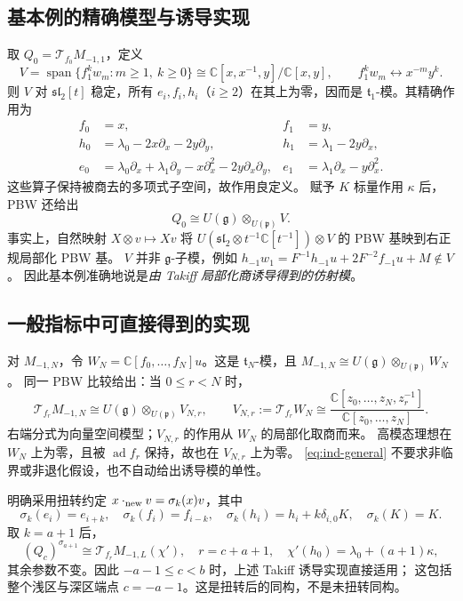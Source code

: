 \documentclass[UTF8,11pt,a4paper,fontset=fandol]{ctexart}
\theoremstyle{upright}
\newcommand{\C}{\mathbb C}
\newcommand{\g}{\mathfrak g}
\newcommand{\p}{\mathfrak p}
\newcommand{\slc}{\mathfrak{sl}_2}
\newcommand{\T}{\mathcal T}
\DeclareMathOperator{\ad}{ad}
\DeclareMathOperator{\Span}{span}
\begin{document}
\subsection{基本例的精确模型与诱导实现}
取 $Q_0=\T_{f_0}M_{-1,1}$，定义
\[
V=\Span\{f_1^kw_m:m\ge1,\ k\ge0\}
\cong\C[x,x^{-1},y]/\C[x,y],\qquad f_1^kw_m\longleftrightarrow x^{-m}y^k.
\]
则 $V$ 对 $\slc[t]$ 稳定，所有 $e_i,f_i,h_i$（$i\ge2$）在其上为零，因而是
$\mathfrak t_1$-模。其精确作用为 \cite[Section 6]{Unified}
\begin{equation}\label{eq:takiff}
\begin{aligned}
f_0&=x,& f_1&=y,\\
h_0&=\lambda_0-2x\partial_x-2y\partial_y,
&h_1&=\lambda_1-2y\partial_x,\\
e_0&=\lambda_0\partial_x+\lambda_1\partial_y
-x\partial_x^2-2y\partial_x\partial_y,
&e_1&=\lambda_1\partial_x-y\partial_x^2.
\end{aligned}
\end{equation}
这些算子保持被商去的多项式子空间，故作用良定义。
赋予 $K$ 标量作用 $\kappa$ 后，PBW 还给出
\begin{equation}\label{eq:ind-basic}
\boxed{\quad Q_0\cong U(\g)\otimes_{U(\p)}V.\quad}
\end{equation}
事实上，自然映射 $X\otimes v\mapsto Xv$ 将
$U(\slc\otimes t^{-1}\C[t^{-1}])\otimes V$ 的 PBW 基映到右正规局部化 PBW 基。
$V$ 并非 $\g$-子模，例如
$h_{-1}w_1=F^{-1}h_{-1}u+2F^{-2}f_{-1}u+M\notin V$。
因此基本例准确地说是\emph{由 Takiff 局部化商诱导得到的仿射模}。

\subsection{一般指标中可直接得到的实现}
对 $M_{-1,N}$，令 $W_N=\C[f_0,\ldots,f_N]u$。这是 $\mathfrak t_N$-模，且
$M_{-1,N}\cong U(\g)\otimes_{U(\p)}W_N$ \cite[Lemma 2.2]{FGXZ}。
同一 PBW 比较给出：当 $0\le r<N$ 时，
\begin{equation}\label{eq:ind-general}
\T_{f_r}M_{-1,N}\cong U(\g)\otimes_{U(\p)}V_{N,r},\qquad
V_{N,r}:=\T_{f_r}W_N
\cong\frac{\C[z_0,\ldots,z_N,z_r^{-1}]}{\C[z_0,\ldots,z_N]}.
\end{equation}
右端分式为向量空间模型；$V_{N,r}$ 的作用从 $W_N$ 的局部化取商而来。
高模态理想在 $W_N$ 上为零，且被 $\ad f_r$ 保持，故也在 $V_{N,r}$ 上为零。
\eqref{eq:ind-general} 不要求非临界或非退化假设，也不自动给出诱导模的单性。

明确采用扭转约定 $x\cdot_{\rm new}v=\sigma_k(x)v$，其中
\[
\sigma_k(e_i)=e_{i+k},\quad \sigma_k(f_i)=f_{i-k},\quad
\sigma_k(h_i)=h_i+k\delta_{i,0}K,\quad \sigma_k(K)=K.
\]
取 $k=a+1$ 后，
\[
(Q_c)^{\sigma_{a+1}}\cong\T_{f_r}M_{-1,L}(\chi'),\quad
r=c+a+1,\quad \chi'(h_0)=\lambda_0+(a+1)\kappa,
\]
其余参数不变。因此 $-a-1\le c<b$ 时，上述 Takiff 诱导实现直接适用；
这包括整个浅区与深区端点 $c=-a-1$。这是扭转后的同构，不是未扭转同构。
\end{document}
